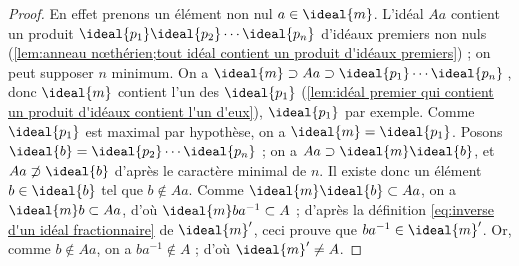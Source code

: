 \documentclass[11pt, %
  title in boldface,
  theorem in new line,
  theorem numbering = section,
  number theorems separately,
  simple name,
]{beaulivre}
\begin{document}
\begin{proof}
        En effet prenons un élément non nul \( a \in \ideal{m} \). L'idéal \( Aa \) contient un produit \( \ideal{p_1} \ideal{p_2} \cdots \ideal{p_n} \) d'idéaux premiers non nuls (\cref{lem:anneau nœthérien;tout idéal contient un produit d'idéaux premiers}) ; on peut supposer \( n \) minimum. On a \( \ideal{m} \supset Aa \supset \ideal{p_1} \cdots \ideal{p_n} \)\,, donc \( \ideal{m} \) contient l'un des \( \ideal{p_1} \) (\cref{lem:idéal premier qui contient un produit d'idéaux contient l'un d'eux}), \( \ideal{p_1} \) par exemple. Comme \( \ideal{p_1} \) est maximal par hypothèse, on a \( \ideal{m} = \ideal{p_1} \). Posons \( \ideal{b} = \ideal{p_2} \cdots \ideal{p_n} \) ; on a \( Aa \supset \ideal{m}\ideal{b} \), et \( Aa \not\supset \ideal{b} \) d'après le caractère minimal de \( n \). Il existe donc un élément \( b \in \ideal{b} \) tel que \( b \notin Aa \). Comme \( \ideal{m}\ideal{b} \subset Aa \), on a \( \ideal{m} b \subset Aa \), d'où \( \ideal{m} b a^{-1} \subset A \) ; d'après la définition \eqref{eq:inverse d'un idéal fractionnaire} de \( \ideal{m}' \), ceci prouve que \( ba^{-1} \in \ideal{m}' \). Or, comme \( b \notin Aa \), on a \( ba^{-1} \notin A \) ; d'où \( \ideal{m}' \neq A \).
    \end{proof}
\end{document}
